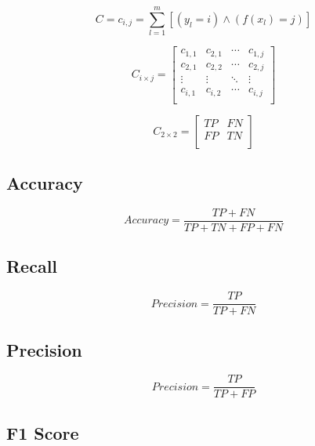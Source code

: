 \begin{equation}\label{eq}
C = {c_{i,j} = \sum_{l=1}^{m}[(y_l=i) \land (f(x_l)=j)]}
\end{equation}

\begin{equation}\label{eq}
    C_{i \times j} = \begin{bmatrix}
    c_{1,1} & c_{2,1} & \cdots & c_{1,j} \\
    c_{2,1} & c_{2,2} & \cdots & c_{2,j} \\
    \vdots & \vdots & \ddots & \vdots \\
    c_{i,1} & c_{i,2} & \cdots & c_{i,j} \\
    \end{bmatrix}
\end{equation}


\begin{equation}
    C_{2 \times 2} = \begin{bmatrix}
    TP & FN \\
    FP & TN \\
    \end{bmatrix}
    \end{equation}


\subsection{Accuracy}

\begin{equation}\label{eq}
    Accuracy = \frac{TP + FN}{TP + TN + FP + FN}
\end{equation}

\subsection{Recall}

\begin{equation}\label{eq}
    Precision = \frac{TP}{TP + FN}
\end{equation}

\subsection{Precision}

\begin{equation}\label{eq}
    Precision = \frac{TP}{TP + FP}
\end{equation}

\subsection{F1 Score}

